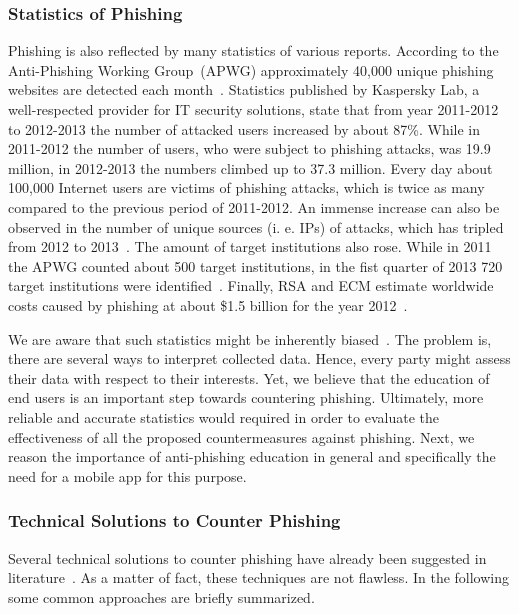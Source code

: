 \subsubsection{Statistics of Phishing}
\label{s:stats}
Phishing is also reflected by many statistics of various reports. 
 According to the Anti-Phishing Working Group~(APWG) approximately 40,000 unique phishing websites are detected each month~\cite{antiphishingtrendreport2013}. Statistics published by Kaspersky Lab, a well-respected provider for IT security solutions, state that from year 2011-2012 to 2012-2013 the number of attacked users increased by about 87\%. While in 2011-2012 the number of users, who were subject to phishing attacks, was 19.9 million, in 2012-2013 the numbers climbed up to 37.3 million. 
 Every day about 100,000 Internet users are victims of phishing attacks, which is twice as many compared to the previous period of 2011-2012. An immense increase can also be observed in the number of unique sources (i.
e. 
 IPs) of attacks, which has tripled from 2012 to 2013~\cite{kasperskyreport2013}. The amount of target institutions also rose. 
 While in 2011 the APWG counted about 500 target institutions, in the fist quarter of 2013 720 target institutions were identified~\cite{antiphishingglobalreport2013}. 
Finally, RSA and ECM estimate worldwide costs caused by phishing at about \$1.5 billion for the year 2012~\cite{rsa2013}. 

We are aware that such statistics might be inherently biased~\cite{moore2010hard}. 
The problem is, there are several ways to interpret collected data. 
Hence, every party might assess their data with respect to their interests. 
Yet, we believe that the education of end users is an important step towards countering phishing. 
Ultimately, more reliable and accurate statistics would required in order to evaluate the effectiveness of all the proposed countermeasures against phishing. 
Next, we reason the importance of anti-phishing education in general and specifically the need for a mobile app for this purpose.

\subsubsection{Technical Solutions to Counter Phishing}

Several technical solutions to counter phishing have already been suggested in literature~\cite{purkait2012phishing}. 
As a matter of fact, these techniques are not flawless. 
In the following some common approaches are briefly summarized.

